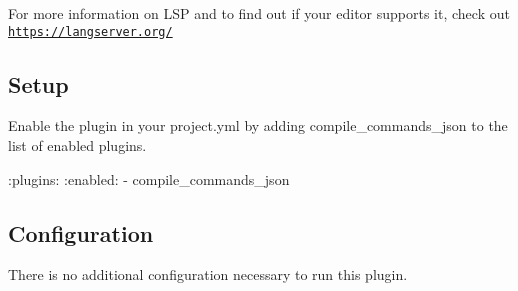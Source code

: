 For more information on L\+SP and to find out if your editor supports it, check out \href{https://langserver.org/}{\tt https\+://langserver.\+org/}

\subsection*{Setup}

Enable the plugin in your project.\+yml by adding {\ttfamily compile\+\_\+commands\+\_\+json} to the list of enabled plugins.


\begin{DoxyCode}
:plugins:
  :enabled:
    - compile\_commands\_json
\end{DoxyCode}


\subsection*{Configuration}

There is no additional configuration necessary to run this plugin. 